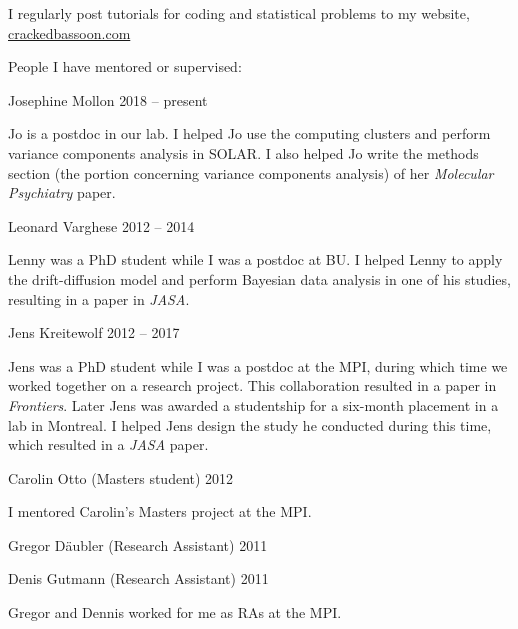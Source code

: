 \documentclass[10pt]{article}
\makeatletter
\newlength{\bibhang}
\newlength{\bibsep}
 {\@listi \global\bibsep\itemsep \global\advance\bibsep by\parsep}
\newenvironment{bibsection}%
        {\vspace{-\baselineskip}\begin{list}{}{%
       \setlength{\leftmargin}{\bibhang}%
       \setlength{\itemindent}{-\leftmargin}%
       \setlength{\itemsep}{\bibsep}%
       \setlength{\parsep}{\z@}%
        \setlength{\partopsep}{0pt}%
        \setlength{\topsep}{0pt}}}
        {\end{list}\vspace{-.6\baselineskip}}
\newenvironment{outerlist}[1][\enskip\textbullet]%
        {\begin{itemize}[#1]}{\end{itemize}%
         \vspace{-.6\baselineskip}}
\newenvironment{innerlist}[1][\enskip\textbullet]%
        {\begin{compactitem}[#1]}{\end{compactitem}}
\makeatother
\begin{document}
\begin{bibsection}
\item I regularly post tutorials for coding and statistical problems to my website, \href{mailto:https://crackedbassoon.com}{crackedbassoon.com}
\item People I have mentored or supervised:
\begin{outerlist}
\item[]Josephine Mollon \hfill{2018 -- present}
\begin{innerlist}\item Jo is a postdoc in our lab. I helped Jo use the computing clusters and perform variance components analysis in SOLAR. I also helped Jo write the methods section (the portion concerning variance components analysis) of her \emph{Molecular Psychiatry} paper.\end{innerlist}
\item[]Leonard Varghese \hfill{2012 -- 2014}
\begin{innerlist}\item Lenny was a PhD student while I was a postdoc at BU. I helped Lenny to apply the drift-diffusion model and perform Bayesian data analysis in one of his studies, resulting in a paper in \emph{JASA}.\end{innerlist}
\item[]Jens Kreitewolf \hfill{2012 -- 2017}
\begin{innerlist}\item Jens was a PhD student while I was a postdoc at the MPI, during which time we worked together on a research project. This collaboration resulted in a paper in \emph{Frontiers}. Later Jens was awarded a studentship for a six-month placement in a lab in Montreal. I helped Jens design the study he conducted during this time, which resulted in a \emph{JASA} paper.\end{innerlist}
\item[]Carolin Otto (Masters student)  \hfill{2012}
\begin{innerlist}\item I mentored Carolin's Masters project at the MPI.\end{innerlist}
\item[]Gregor Däubler (Research Assistant) \hfill{2011}
\item[]Denis Gutmann (Research Assistant) \hfill{2011}
\begin{innerlist}\item Gregor and Dennis worked for me as RAs at the MPI.\end{innerlist}
\end{outerlist}



\end{bibsection}
\end{document}
